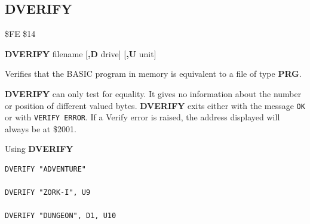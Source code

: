 \subsection{DVERIFY}
\begin{description}[leftmargin=2cm,style=nextline]
\item [Token:]    \$FE \$14

\item [Format:]   {\bf DVERIFY} filename [{\bf,D} drive] [{\bf,U} unit]

\item [Usage:]    Verifies that the BASIC program in memory is equivalent to a file of type {\bf PRG}.

                  \filenamedefinition

                  \drivedefinition

                  \unitdefinition

\item [Remarks:]  {\bf DVERIFY} can only test for equality. It gives no information about the number or position of different valued bytes. {\bf DVERIFY} exits either with the message \texttt{OK} or with \texttt{VERIFY ERROR}. If a Verify error is raised, the address displayed will always be at \$2001.

\item [Examples:] Using {\bf DVERIFY}

\begin{tcolorbox}[colback=black,coltext=white]
\verbatimfont{\codefont}
\begin{verbatim}
DVERIFY "ADVENTURE"

DVERIFY "ZORK-I", U9

DVERIFY "DUNGEON", D1, U10
\end{verbatim}
\end{tcolorbox}
\end{description}


\newpage
